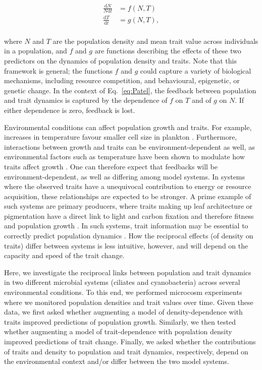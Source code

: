 \documentclass{article}
\begin{document}
\begin{equation}
    \begin{split}
        \frac{\text{d}N}{N\text{d}t} & = f(N, T) \\
        \frac{\text{d}T}{\text{d}t} & = g(N, T), \\
    \end{split}
\label{eq:Patel}    
\end{equation}

where $N$ and $T$ are the population density and mean trait value across individuals in a population, and $f$ and $g$ are functions describing the effects of these two predictors on the dynamics of population density and traits. Note that this framework is general; the functions $f$ and $g$ could capture a variety of biological mechanisms, including resource competition, and behavioural, epigenetic, or genetic change. In the context of Eq.~\ref{eq:Patel}, the feedback between population and trait dynamics is captured by the dependence of $f$ on $T$ and of $g$ on $N$. If either dependence is zero, feedback is lost.

Environmental conditions can affect population growth and traits. For example, increases in temperature favour smaller cell size in plankton \cite{Fernandez-Gonzalez2021}. Furthermore, interactions between growth and traits can be environment-dependent as well, as environmental factors such as temperature have been shown to modulate how traits affect growth \cite{Brown2004, Gillooly2001, Kremer2017a}. One can therefore expect that feedbacks will be environment-dependent, as well as differing among model systems. In systems where the observed traits have a unequivocal contribution to energy or resource acquisition, these relationships are expected to be stronger. A prime example of such systems are primary producers, where traits making up leaf architecture or pigmentation have a direct link to light and carbon fixation and therefore fitness and population growth \cite{Chin2023}. In such systems, trait information may be essential to correctly predict population dynamics \cite{Stomp2004}. How the reciprocal effects (of density on traits) differ between systems is less intuitive, however, and will depend on the capacity and speed of the trait change.

Here, we investigate the reciprocal links between population and trait dynamics in two different microbial systems (ciliates and cyanobacteria) across several environmental conditions. To this end, we performed microcosm experiments where we monitored population densities and trait values over time. Given these data, we first asked whether augmenting a model of density-dependence with traits improved predictions of population growth. Similarly, we then tested whether augmenting a model of trait-dependence with population density improved predictions of trait change. Finally, we asked whether the contributions of traits and density to population and trait dynamics, respectively, depend on the environmental context and/or differ between the two model systems. 
\end{document}
